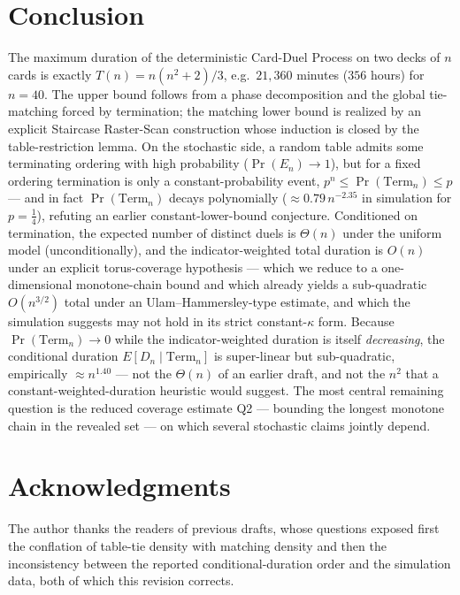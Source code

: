 \documentclass[11pt]{article}
\theoremstyle{definition}
\theoremstyle{remark}
\newcommand{\Term}{\mathrm{Term}}
\begin{document}
\section{Conclusion}
The maximum duration of the deterministic Card-Duel Process on two decks of $n$ cards is exactly $T(n) = n(n^2 + 2)/3$,
e.g.\ $21{,}360$ minutes ($356$ hours) for $n = 40$. The upper bound follows from a phase decomposition and the global
tie-matching forced by termination; the matching lower bound is realized by an explicit Staircase Raster-Scan construction
whose induction is closed by the table-restriction lemma. On the stochastic side, a random table admits some terminating
ordering with high probability ($\Pr(E_n) \to 1$), but for a fixed ordering termination is only a constant-probability
event, $p^n \le \Pr(\Term_n) \le p$ --- and in fact $\Pr(\Term_n)$ decays polynomially ($\approx 0.79\, n^{-2.35}$ in
simulation for $p = \tfrac14$), refuting an earlier constant-lower-bound conjecture. Conditioned on termination, the
expected number of distinct duels is $\Theta(n)$ under the uniform model (unconditionally), and the indicator-weighted
total duration is $O(n)$ under an explicit torus-coverage hypothesis --- which we reduce to a one-dimensional monotone-chain
bound and which already yields a sub-quadratic $O(n^{3/2})$ total under an Ulam--Hammersley-type estimate, and which the
simulation suggests may not hold in its strict constant-$\kappa$ form. Because $\Pr(\Term_n) \to 0$ while the
indicator-weighted duration is itself \emph{decreasing}, the conditional duration $E[D_n \mid \Term_n]$ is super-linear but
sub-quadratic, empirically $\approx n^{1.40}$ --- not the $\Theta(n)$ of an earlier draft, and not the $n^2$ that a
constant-weighted-duration heuristic would suggest. The most central remaining question is the reduced coverage estimate Q2
--- bounding the longest monotone chain in the revealed set --- on which several stochastic claims jointly depend.

\section*{Acknowledgments}
The author thanks the readers of previous drafts, whose questions exposed first the conflation of table-tie density with
matching density and then the inconsistency between the reported conditional-duration order and the simulation data, both of
which this revision corrects.
\end{document}
